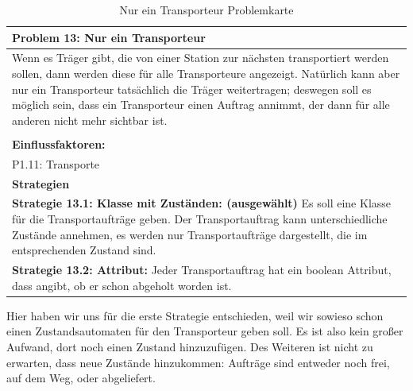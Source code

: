 \documentclass[enabledeprecatedfontcommands,fontsize=12pt,paper=a4,twoside]{scrartcl}
\begin{document}
\begin{table}[H]
    \centering
    \begin{tabular}{|p{15cm}|}
    \hline
          \textbf{Problem 13:} Nur ein Transporteur
          \\ \hline
          Wenn es Träger gibt, die von einer Station zur nächsten transportiert werden sollen, dann werden diese für alle Transporteure angezeigt. Natürlich kann aber nur ein Transporteur tatsächlich die Träger weitertragen; deswegen soll es möglich sein, dass ein Transporteur einen Auftrag annimmt, der dann für alle anderen nicht mehr sichtbar ist. \\
        \\  \hline
        \textbf{Einflussfaktoren: } \\
	 P1.11: Transporte \\ 
        \hline
        \textbf{Strategien} \\
         \textbf{Strategie 13.1: Klasse mit Zuständen: (ausgewählt)} Es soll eine Klasse für die Transportaufträge geben. Der Transportauftrag kann unterschiedliche Zustände annehmen, es werden nur Transportaufträge dargestellt, die im entsprechenden Zustand sind. \\
	\textbf{Strategie 13.2: Attribut:} Jeder Transportauftrag hat ein boolean Attribut, dass angibt, ob er schon abgeholt worden ist. \\ 
    \end{tabular}
    \caption{Nur ein Transporteur Problemkarte}
    \label{tab:ProblemKarte13}
\end{table}
Hier haben wir uns für die erste Strategie entschieden, weil wir sowieso schon einen Zustandsautomaten für den Transporteur geben soll. Es ist also kein großer Aufwand, dort noch einen Zustand hinzuzufügen. Des Weiteren ist nicht zu erwarten, dass neue Zustände hinzukommen: Aufträge sind entweder noch frei, auf dem Weg, oder abgeliefert. \\
\end{document}
